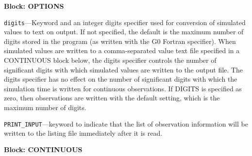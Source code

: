 
\item \textbf{Block: OPTIONS}

\begin{description}
\item \texttt{digits}---Keyword and an integer digits specifier used for conversion of simulated values to text on output. If not specified, the default is the maximum number of digits stored in the program (as written with the G0 Fortran specifier). When simulated values are written to a comma-separated value text file specified in a CONTINUOUS block below, the digits specifier controls the number of significant digits with which simulated values are written to the output file. The digits specifier has no effect on the number of significant digits with which the simulation time is written for continuous observations.  If DIGITS is specified as zero, then observations are written with the default setting, which is the maximum number of digits.

\item \texttt{PRINT\_INPUT}---keyword to indicate that the list of observation information will be written to the listing file immediately after it is read.

\end{description}
\item \textbf{Block: CONTINUOUS}

